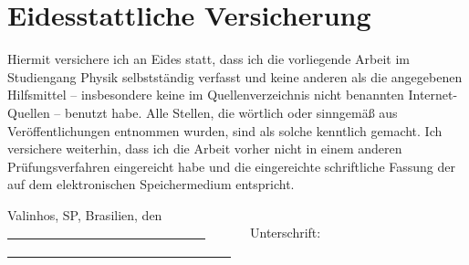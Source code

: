 \section*{Eidesstattliche Versicherung}
Hiermit versichere ich an Eides statt, dass ich die vorliegende Arbeit im Studiengang Physik
selbstständig verfasst und keine anderen als die angegebenen Hilfsmittel – insbesondere keine im Quellenverzeichnis nicht benannten Internet-Quellen – benutzt habe.
Alle Stellen, die wörtlich oder sinngemäß aus Veröffentlichungen entnommen wurden, sind als solche kenntlich gemacht. 
Ich versichere weiterhin, dass ich die Arbeit vorher nicht in einem anderen Prüfungsverfahren eingereicht habe und die eingereichte schriftliche Fassung der auf dem elektronischen Speichermedium entspricht.
\vspace{1cm} 

\noindent Valinhos, SP, Brasilien, den \underline{~~~~~~~~~~~~~~~~~~~~~~~~~~~~~~~}~~~~~~~Unterschrift: \underline{~~~~~~~~~~~~~~~~~~~~~~~~~~~~~~~~~~~} 

\let \cleardoublepage \clearpage



